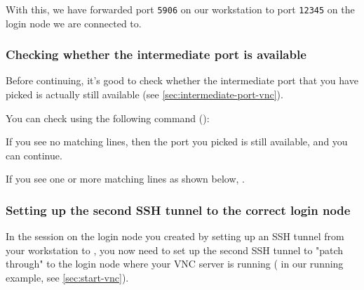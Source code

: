 \fi

With this, we have forwarded port \lstinline|5906| on our workstation to port \lstinline|12345|
on the login node we are connected to.


\subsubsection{Checking whether the intermediate port is available}

Before continuing, it's good to check whether the intermediate port that you have picked
is actually still available (see \autoref{sec:intermediate-port-vnc}).

You can check using the following command ():

\begin{prompt}
\end{prompt}

If you see no matching lines, then the port you picked is still available, and you can continue.

If you see one or more matching lines as shown below, .

\begin{prompt}
\end{prompt}

\subsubsection{Setting up the second SSH tunnel to the correct login node}

In the session on the login node you created by setting up an SSH tunnel from your workstation
to \texttt{\loginnode}, you now need to set up the second SSH tunnel to "patch through" to the login
node where your VNC server is running (\texttt{\loginhost} in our running example, see \autoref{sec:start-vnc}).

